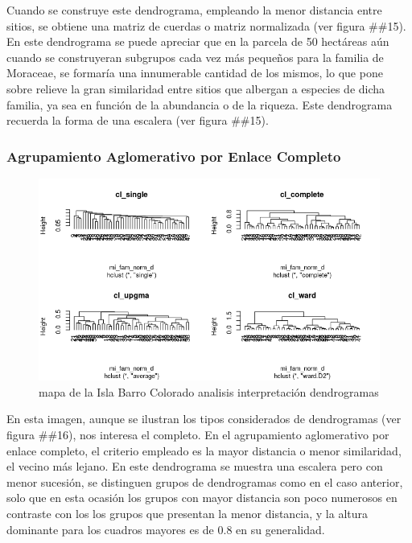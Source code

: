 \documentclass[11pt,]{article}
\begin{document}
Cuando se construye este dendrograma, empleando la menor distancia entre
sitios, se obtiene una matriz de cuerdas o matriz normalizada (ver
figura \#\#15). En este dendrograma se puede apreciar que en la parcela
de 50 hectáreas aún cuando se construyeran subgrupos cada vez más
pequeños para la familia de Moraceae, se formaría una innumerable
cantidad de los mismos, lo que pone sobre relieve la gran similaridad
entre sitios que albergan a especies de dicha familia, ya sea en función
de la abundancia o de la riqueza. Este dendrograma recuerda la forma de
una escalera (ver figura \#\#15).

\subsubsection{Agrupamiento Aglomerativo por Enlace
Completo}\label{agrupamiento-aglomerativo-por-enlace-completo}

\begin{figure}
\centering
\includegraphics[width=1.00000\textwidth]{analisis_interpretacion_dendrogramas.png}
\caption{mapa de la Isla Barro Colorado analisis interpretación
dendrogramas \label{fig:bci_map}}
\end{figure}

En esta imagen, aunque se ilustran los tipos considerados de
dendrogramas (ver figura \#\#16), nos interesa el completo. En el
agrupamiento aglomerativo por enlace completo, el criterio empleado es
la mayor distancia o menor similaridad, el vecino más lejano. En este
dendrograma se muestra una escalera pero con menor sucesión, se
distinguen grupos de dendrogramas como en el caso anterior, solo que en
esta ocasión los grupos con mayor distancia son poco numerosos en
contraste con los los grupos que presentan la menor distancia, y la
altura dominante para los cuadros mayores es de 0.8 en su generalidad.
\end{document}
